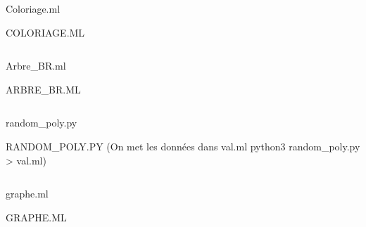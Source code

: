 \documentclass{beamer}
\begin{document}
\begin{frame}{Coloriage.ml}
    \begin{center}
        COLORIAGE.ML 
    \end{center}    
\end{frame}
\inputminted[obeytabs=true,tabsize=2, breaklines, linenos, fontsize=\tiny]{ocaml}{Coloriage.ml}

\begin{frame}{Arbre\_BR.ml}
    \begin{center}
        ARBRE\_BR.ML 
    \end{center}    
\end{frame}
\inputminted[obeytabs=true,tabsize=2, breaklines, linenos, fontsize=\tiny]{ocaml}{Arbre_BR.ml}

\begin{frame}{random\_poly.py}
    \begin{center}
        RANDOM\_POLY.PY (On met les données dans val.ml python3 random\_poly.py > val.ml)
    \end{center}    
\end{frame}
\inputminted[obeytabs=true,tabsize=2, breaklines, linenos, fontsize=\tiny]{python}{random_poly.py}

\begin{frame}{graphe.ml}
    \begin{center}
        GRAPHE.ML 
    \end{center}    
\end{frame}
\inputminted[obeytabs=true,tabsize=2, breaklines, linenos, fontsize=\tiny]{ocaml}{graphe.ml}
\end{document}
